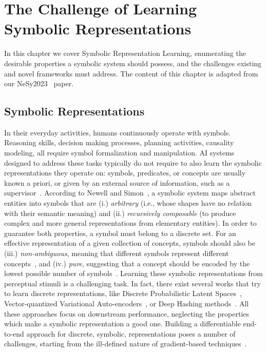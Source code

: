 \chapter{The Challenge of Learning Symbolic Representations}
\label{chap:chalsymb}

In this chapter we cover Symbolic Representation Learning, enumerating the desirable properties a symbolic system should possess, and the challenges existing and novel frameworks must address. The content of this chapter is adapted from our NeSy2023~\cite{lorello2023challenge} paper.


\section{Symbolic Representations}
In their everyday activities, humans continuously operate with symbols. Reasoning skills, decision making processes, planning activities, causality modeling, all require symbol formalization and manipulation. AI systems designed to address these tasks typically do not require to also learn the symbolic representations they operate on: symbols, predicates, or concepts are usually known a priori, or given by an external source of information, such as a supervisor~\cite{ciravegna2023logic}.
%
According to Newell and Simon~\cite{newell1972human}, a symbolic system maps abstract entities into symbols that are (i.) \textit{arbitrary} (i.e., whose shapes have no relation with their semantic meaning) and (ii.) \textit{recursively composable} (to produce complex and more general representations from elementary entities). In order to guarantee both properties, a symbol must belong to a discrete set.
%
For an effective representation of a given collection of concepts,  symbols should also be (iii.) \textit{non-ambiguous}, meaning that different symbols represent different concepts~\cite{asai2018classical}, and (iv.) \textit{pure}, suggesting that a concept should be encoded by the lowest possible number of symbols~\cite{chen2020concept}.
%
Learning these symbolic representations from perceptual stimuli is a challenging task. In fact, there exist several works that try to learn discrete representations, like Discrete Probabilistic Latent Spaces~\cite{asai2018classical}, Vector-quantized Variational Auto-encoders~\cite{van2017neural}, or Deep Hashing methods~\cite{luo2020survey}. All these approaches focus on downstream performance, neglecting the properties which make a symbolic representation a good one.
Building a differentiable end-to-end approach for discrete, symbolic, representations poses a number of challenges, starting from the ill-defined nature of gradient-based techniques~\cite{poganvcic2020differentiation}.
